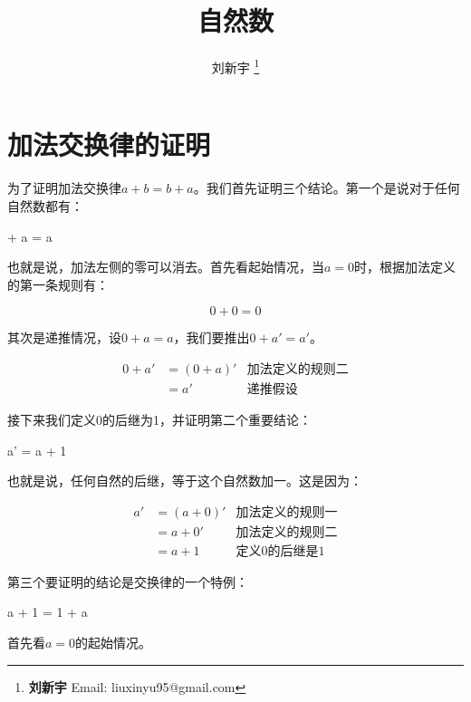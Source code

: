 \documentclass[UTF8]{article}
\begin{document}

\title{自然数}

\author{刘新宇
\thanks{{\bfseries 刘新宇} \newline
  Email: liuxinyu95@gmail.com \newline}
  }

\maketitle
\fi


\section{加法交换律的证明}

为了证明加法交换律$a + b = b + a$。我们首先证明三个结论。第一个是说对于任何自然数都有：

 + a = a
\label{eq:left-zero}
\ee

也就是说，加法左侧的零可以消去。首先看起始情况，当$a=0$时，根据加法定义的第一条规则有：

\[
0 + 0 = 0
\]

其次是递推情况，设$0 + a = a$，我们要推出$0 + a' = a'$。

\[
\begin{array}{rlr}
0 + a' & = (0 + a)' & \text{加法定义的规则二} \\
       & = a' & \text{递推假设}
\end{array}
\]

接下来我们定义0的后继为1，并证明第二个重要结论：

\be
a' = a + 1
\label{eq:one-succ}
\ee

也就是说，任何自然的后继，等于这个自然数加一。这是因为：

\[
\begin{array}{rlr}
a' & = (a + 0)' & \text{加法定义的规则一} \\
   & = a + 0' & \text{加法定义的规则二} \\
   & = a + 1 & \text{定义0的后继是1}
\end{array}
\]

第三个要证明的结论是交换律的一个特例：

\be
a + 1 = 1 + a
\label{eq:one-commu}
\ee

首先看$a = 0$的起始情况。
\end{document}
